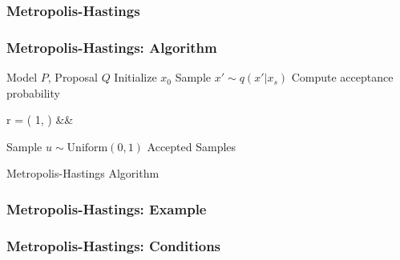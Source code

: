 \documentclass{beamer}
\begin{document}
\begin{frame}
\frametitle{Metropolis-Hastings}
\end{frame}


\begin{frame}
\frametitle{Metropolis-Hastings: Algorithm}
  \begin{algorithm}[H]
  \scriptsize
  \begin{algorithmic}[1]
    \REQUIRE Model $P$, Proposal $Q$
    \STATE Initialize $x_0$
      \STATE Sample $x' \sim q(x'|x_s)$
      \STATE Compute acceptance probability
        \begin{flalign*}
          r = \min\left( 1, \;   \right) &&
        \end{flalign*}
      \STATE Sample $u \sim \text{Uniform}(0, 1)$
      \ELSE
      \ENDIF
    \ENDFOR
    \ENSURE Accepted Samples
  \end{algorithmic}
  \caption{Metropolis-Hastings Algorithm}
  \end{algorithm}
\end{frame}


\begin{frame}
\frametitle{Metropolis-Hastings: Example}
\end{frame}


\begin{frame}
\frametitle{Metropolis-Hastings: Conditions}
\end{frame}


\end{document}
